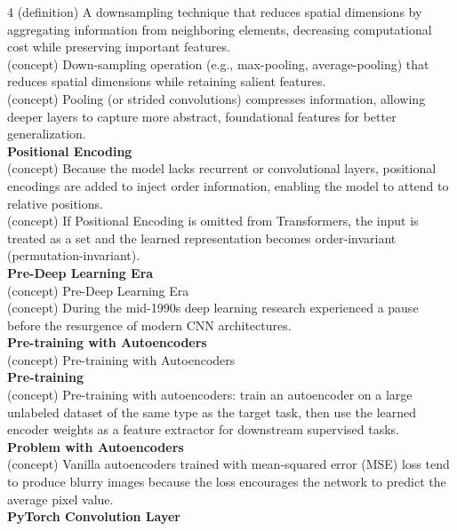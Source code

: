 \documentclass[8pt]{extarticle}
\begin{document}
\begin{multicols}{4}
(definition) A downsampling technique that reduces spatial dimensions by aggregating information from neighboring elements, decreasing computational cost while preserving important features.\\
(concept) Down-sampling operation (e.g., max-pooling, average-pooling) that reduces spatial dimensions while retaining salient features.\\
(concept) Pooling (or strided convolutions) compresses information, allowing deeper layers to capture more abstract, foundational features for better generalization.\\
\vspace{2pt}\textbf{Positional Encoding}\\
(concept) Because the model lacks recurrent or convolutional layers, positional encodings are added to inject order information, enabling the model to attend to relative positions.\\
(concept) If Positional Encoding is omitted from Transformers, the input is treated as a set and the learned representation becomes order-invariant (permutation-invariant).\\
\vspace{2pt}\textbf{Pre-Deep Learning Era}\\
(concept) Pre-Deep Learning Era\\
(concept) During the mid-1990s deep learning research experienced a pause before the resurgence of modern CNN architectures.\\
\vspace{2pt}\textbf{Pre-training with Autoencoders}\\
(concept) Pre-training with Autoencoders\\
\vspace{2pt}\textbf{Pre‑training}\\
(concept) Pre-training with autoencoders: train an autoencoder on a large unlabeled dataset of the same type as the target task, then use the learned encoder weights as a feature extractor for downstream supervised tasks.\\
\vspace{2pt}\textbf{Problem with Autoencoders}\\
(concept) Vanilla autoencoders trained with mean-squared error (MSE) loss tend to produce blurry images because the loss encourages the network to predict the average pixel value.\\
\vspace{2pt}\textbf{PyTorch Convolution Layer}\\

\end{multicols}
\end{document}
